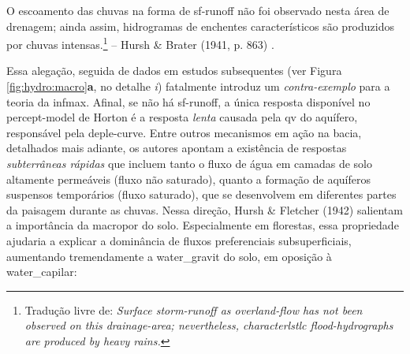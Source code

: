 \documentclass[./main.tex]{subfiles}
\begin{document}
\begin{adjustwidth}{100pt}{0pt}
\medskip
\small O escoamento das chuvas na forma de \gls{sf-runoff} não foi observado nesta área de drenagem; ainda assim, hidrogramas de enchentes característicos são produzidos por chuvas intensas.\footnote{Tradução livre de: \textit{Surface storm-runoff as overland-flow has not been observed on this drainage-area; nevertheless, characterlstlc flood-hydrographs are produced by heavy rains.}} -- Hursh \& Brater (1941, p. 863) \cite{Hursh1941}.
\medskip
\end{adjustwidth}

\noindent Essa alegação, seguida de dados em estudos subsequentes (ver Figura \ref{fig:hydro:macro}\textbf{a}, no detalhe \textit{i}) fatalmente introduz um \textit{contra-exemplo} para a \gls{teoria} da \gls{infmax}.  Afinal, se não há \gls{sf-runoff}, a única resposta disponível no \gls{percept-model} de Horton é a resposta \textit{lenta} causada pela \gls{qv} do aquífero, responsável pela \gls{deple-curve}. Entre outros mecanismos em ação na bacia, detalhados mais adiante, os autores apontam a existência de respostas \textit{subterrâneas rápidas} que incluem tanto o fluxo de água em camadas de solo altamente permeáveis (fluxo não saturado), quanto a formação de aquíferos suspensos temporários (fluxo saturado), que se desenvolvem em diferentes partes da paisagem durante as chuvas. Nessa direção, Hursh \& Fletcher (1942) \cite{Hursh1942} salientam a importância da \gls{macropor} do solo. Especialmente em florestas, essa propriedade ajudaria a explicar a dominância de fluxos preferenciais subsuperficiais, aumentando tremendamente a \gls{water_gravit} do solo, em oposição à \gls{water_capilar}:
\end{document}
